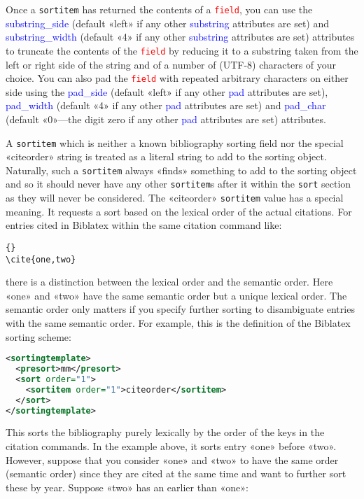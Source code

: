 \documentclass{ltxdockit}
\newcommand*{\biblatex}{Biblatex\xspace}
\begin{document}
Once a \texttt{sortitem} has returned the contents of a
\textcolor{red}{\texttt{field}}, you can use the
\textcolor{blue}{substring\_side} (default «left» if any other
\textcolor{blue}{substring} attributes are set) and
\textcolor{blue}{substring\_width} (default «4» if any other
\textcolor{blue}{substring} attributes are set) attributes to truncate the
contents of the \textcolor{red}{\texttt{field}} by reducing it to a
substring taken from the left or right side of the string and of a number
of (UTF-8) characters of your choice. You can also pad the
\textcolor{red}{\texttt{field}} with repeated arbitrary characters on
either side using the \textcolor{blue}{pad\_side} (default «left» if any other
\textcolor{blue}{pad} attributes are set),
\textcolor{blue}{pad\_width} (default «4» if any other
\textcolor{blue}{pad} attributes are set) and \textcolor{blue}{pad\_char}
(default «0»---the digit zero if any other
\textcolor{blue}{pad} attributes are set) attributes.

A \texttt{sortitem} which is neither a known bibliography sorting field nor
the special «citeorder» string is treated as a literal string to add to the
sorting object. Naturally, such a \texttt{sortitem} always «finds»
something to add to the sorting object and so it should never have any
other \texttt{sortitem}s after it within the \texttt{sort} section as they
will never be considered. The «citeorder» \texttt{sortitem} value has a
special meaning. It requests a sort based on the lexical order of the
actual citations. For entries cited in \biblatex within the same citation
command like:

\begin{lstlisting}[style=latex]{}
\cite{one,two}
\end{lstlisting}
%
there is a distinction between the lexical order and the semantic order.
Here «one» and «two» have the same semantic order but a unique lexical
order. The semantic order only matters if you specify further sorting to
disambiguate entries with the same semantic order. For example, this is the
definition of the \biblatex {} sorting scheme: 

\begin{lstlisting}[language=xml,escapechar=+,mathescape=true]
<sortingtemplate>
  <presort>mm</presort>
  <sort order="1">
    <sortitem order="1">citeorder</sortitem>
  </sort>
</sortingtemplate>
\end{lstlisting}
%
This sorts the bibliography purely lexically by the order of the keys in
the citation commands. In the example above, it sorts entry «one» before «two».
However, suppose that you consider «one» and «two» to have the same order
(semantic order) since they are cited at the same time and want to further
sort these by year. Suppose «two» has an earlier  than
«one»:
\end{document}
